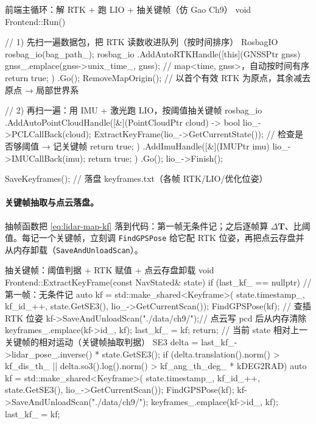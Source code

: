 \begin{codebox}[C++]{前端主循环：解 RTK + 跑 LIO + 抽关键帧（仿 Gao Ch9）}
void Frontend::Run() {
  // 1) 先扫一遍数据包，把 RTK 读数收进队列（按时间排序）
  RosbagIO rosbag_io(bag_path_);
  rosbag_io
    .AddAutoRTKHandle([this](GNSSPtr gnss) {
      gnss_.emplace(gnss->unix_time_, gnss);   // map<time, gnss>，自动按时间有序
      return true;
    })
    .Go();
  RemoveMapOrigin();   // 以首个有效 RTK 为原点，其余减去原点 → 局部世界系

  // 2) 再扫一遍：用 IMU + 激光跑 LIO，按阈值抽关键帧
  rosbag_io
    .AddAutoPointCloudHandle([&](PointCloudPtr cloud) -> bool {
      lio_->PCLCallBack(cloud);
      ExtractKeyFrame(lio_->GetCurrentState());   // 检查是否够阈值 → 记关键帧
      return true;
    })
    .AddImuHandle([&](IMUPtr imu) {
      lio_->IMUCallBack(imu);
      return true;
    })
    .Go();
  lio_->Finish();

  SaveKeyframes();   // 落盘 keyframes.txt（各帧 RTK/LIO/优化位姿）
}
\end{codebox}

\paragraph{关键帧抽取与点云落盘。}
抽帧函数把 \cref{eq:lidar-map-kf} 落到代码：第一帧无条件记；之后逐帧算 $\Delta\mathbf{T}$、比阈值。每记一个关键帧，立刻调 \texttt{FindGPSPose} 给它配 RTK 位姿，再把点云存盘并从内存卸载（\texttt{SaveAndUnloadScan}）。

\begin{codebox}[C++]{抽关键帧：阈值判据 + RTK 赋值 + 点云存盘卸载}
void Frontend::ExtractKeyFrame(const NavStated& state) {
  if (last_kf_ == nullptr) {             // 第一帧：无条件记
    auto kf = std::make_shared<Keyframe>(
        state.timestamp_, kf_id_++, state.GetSE3(), lio_->GetCurrentScan());
    FindGPSPose(kf);                     // 查插 RTK 位姿
    kf->SaveAndUnloadScan("./data/ch9/");// 点云写 pcd 后从内存清除
    keyframes_.emplace(kf->id_, kf);
    last_kf_ = kf;
    return;
  }
  // 当前 state 相对上一关键帧的相对运动（关键帧抽取判据）
  SE3 delta = last_kf_->lidar_pose_.inverse() * state.GetSE3();
  if (delta.translation().norm() > kf_dis_th_ ||
      delta.so3().log().norm() > kf_ang_th_deg_ * kDEG2RAD) {
    auto kf = std::make_shared<Keyframe>(
        state.timestamp_, kf_id_++, state.GetSE3(), lio_->GetCurrentScan());
    FindGPSPose(kf);
    kf->SaveAndUnloadScan("./data/ch9/");
    keyframes_.emplace(kf->id_, kf);
    last_kf_ = kf;
  }
}
\end{codebox}

